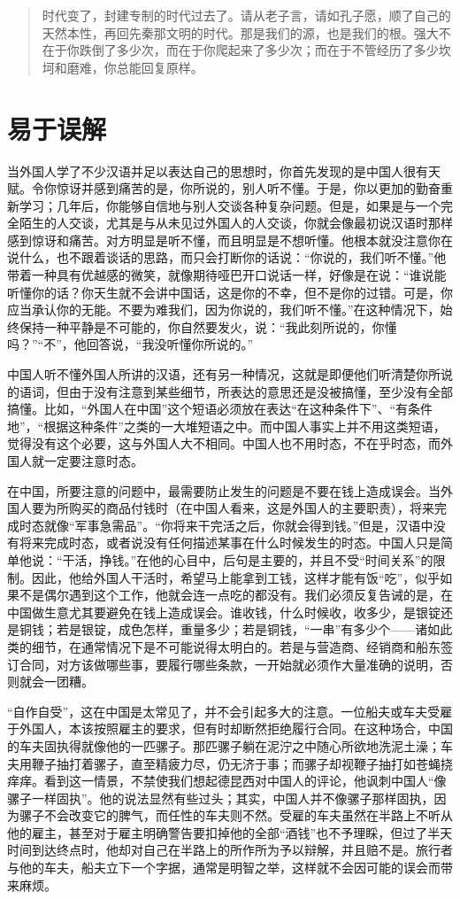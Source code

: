 \documentclass[12pt,oneside]{book}
\begin{document}
\begin{common-format}
\begin{quotation}
时代变了，封建专制的时代过去了。请从老子言，请如孔子愿，顺了自己的天然本性，再回先秦那文明的时代。那是我们的源，也是我们的根。强大不在于你跌倒了多少次，而在于你爬起来了多少次；而在于不管经历了多少坎坷和磨难，你总能回复原样。
\end{quotation}


\chapter{易于误解}
当外国人学了不少汉语并足以表达自己的思想时，你首先发现的是中国人很有天赋。令你惊讶并感到痛苦的是，你所说的，别人听不懂。于是，你以更加的勤奋重新学习；几年后，你能够自信地与别人交谈各种复杂问题。但是，如果是与一个完全陌生的人交谈，尤其是与从未见过外国人的人交谈，你就会像最初说汉语时那样感到惊讶和痛苦。对方明显是听不懂，而且明显是不想听懂。他根本就没注意你在说什么，也不跟着谈话的思路，而只会打断你的话说：“你说的，我们听不懂。”他带着一种具有优越感的微笑，就像期待哑巴开口说话一样，好像是在说：“谁说能听懂你的话？你天生就不会讲中国话，这是你的不幸，但不是你的过错。可是，你应当承认你的无能。不要为难我们，因为你说的，我们听不懂。”在这种情况下，始终保持一种平静是不可能的，你自然要发火，说：“我此刻所说的，你懂吗？”“不”，他回答说，“我没听懂你所说的。” 

中国人听不懂外国人所讲的汉语，还有另一种情况，这就是即便他们听清楚你所说的语词，但由于没有注意到某些细节，所表达的意思还是没被搞懂，至少没有全部搞懂。比如，“外国人在中国”这个短语必须放在表达“在这种条件下”、“有条件地”，“根据这种条件”之类的一大堆短语之中。而中国人事实上并不用这类短语，觉得没有这个必要，这与外国人大不相同。中国人也不用时态，不在乎时态，而外国人就一定要注意时态。 

在中国，所要注意的问题中，最需要防止发生的问题是不要在钱上造成误会。当外国人要为所购买的商品付钱时（在中国人看来，这是外国人的主要职责），将来完成时态就像“军事急需品”。“你将来干完活之后，你就会得到钱。”但是，汉语中没有将来完成时态，或者说没有任何描述某事在什么时候发生的时态。中国人只是简单他说：“干活，挣钱。”在他的心目中，后句是主要的，并且不受“时间关系”的限制。因此，他给外国人干活时，希望马上能拿到工钱，这样才能有饭“吃”，似乎如果不是偶尔遇到这个工作，他就会连一点吃的都没有。我们必须反复告诫的是，在中国做生意尤其要避免在钱上造成误会。谁收钱，什么时候收，收多少，是银锭还是铜钱；若是银锭，成色怎样，重量多少；若是铜钱，“一串”有多少个——诸如此类的细节，在通常情况下是不可能说得太明白的。若是与营造商、经销商和船东签订合同，对方该做哪些事，要履行哪些条款，一开始就必须作大量准确的说明，否则就会一团糟。 

“自作自受”，这在中国是太常见了，并不会引起多大的注意。一位船夫或车夫受雇于外国人，本该按照雇主的要求，但有时却断然拒绝履行合同。在这种场合，中国的车夫固执得就像他的一匹骡子。那匹骡子躺在泥泞之中随心所欲地洗泥土澡；车夫用鞭子抽打着骡子，直至精疲力尽，仍无济于事；而骡子却视鞭子抽打如苍蝇挠痒痒。看到这一情景，不禁使我们想起德昆西对中国人的评论，他讽刺中国人“像骡子一样固执”。他的说法显然有些过头；其实，中国人并不像骡子那样固执，因为骡子不会改变它的脾气，而任性的车夫则不然。受雇的车夫虽然在半路上不听从他的雇主，甚至对于雇主明确警告要扣掉他的全部“酒钱”也不予理睬，但过了半天时间到达终点时，他却对自己在半路上的所作所为予以辩解，并且赔不是。旅行者与他的车夫，船夫立下一个字据，通常是明智之举，这样就不会因可能的误会而带来麻烦。 


\end{common-format}
\end{document}
